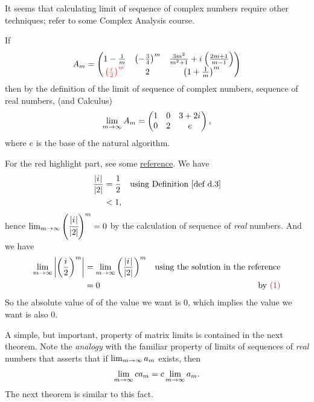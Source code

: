 \begin{note}
It seems that calculating limit of sequence of complex numbers require other techniques;
refer to some Complex Analysis course.
\end{note}

\begin{example} \label{example 5.3.1}
If
\[
    A_m = \begin{pmatrix}
        1 - \frac{1}{m} & \left( - \frac{3}{4} \right)^m & \frac{3m^2}{m^2 + 1} + \iu \left( \frac{2m + 1}{m - 1} \right) \\
        \RED{\left( \frac{\iu}{2} \right)^m} & 2 & \left( 1 + \frac{1}{m} \right)^m
    \end{pmatrix}
\]
then by the definition of the limit of sequence of complex numbers, sequence of real numbers, (and Calculus)
\[
    \lim_{m \to \infty} A_m = \begin{pmatrix}
        1 & 0 & 3 + 2{i\mkern1mu} \\
        0 & 2 & e
    \end{pmatrix},
\]
where \(e\) is the base of the natural algorithm.
\end{example}

\begin{note}
For the red highlight part, see some \href{https://math.stackexchange.com/questions/898296/the-limit-of-complex-sequence}{reference}.
We have
\begin{align*}
    \frac{\abs{\iu}}{\abs{2}} & = \frac{1}{2} & \text{using \DEF{d.3}} \\
        & < 1,
\end{align*}
hence \(\lim_{m \to \infty} \left( \cfrac{\lvert{i\mkern1mu}\rvert}{\lvert2\rvert} \right)^m = 0\)  \quad by the calculation of sequence of \emph{real} numbers.
And we have
\begin{align*}
    \lim_{m \toINF} \left| \left( \frac{\iu}{2} \right)^m \right|
        & = \lim_{m \toINF} \left( \frac{\abs{\iu}}{\abs{2}} \right)^m & \text{using the solution in the reference} \\
        & = 0 & \text{by \MAROON{(1)}}
\end{align*}
So the absolute value of of the value we want is \(0\), which implies the value we want is also \(0\).
\end{note}

\begin{remark} \label{remark 5.3.1}
A simple, but important, property of matrix limits is contained in the next theorem.
Note the \emph{analogy} with the familiar property of limits of sequences of \emph{real} numbers that asserts that if \(\lim_{m \to \infty} a_m\) exists, then
\[
    \lim_{m \to \infty} c a_m = c \lim_{m \to \infty} a_m.
\]
The next theorem is similar to this fact.
\end{remark}

